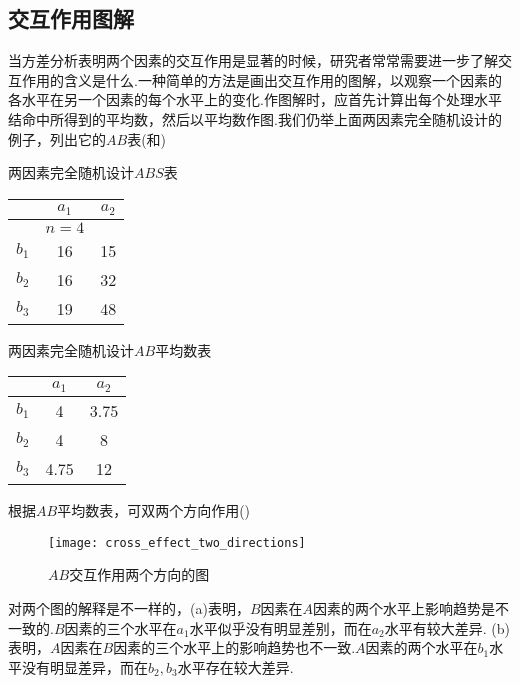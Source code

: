 \subsection{交互作用图解}
当方差分析表明两个因素的交互作用是显著的时候，研究者常常需要进一步了解交互作用的含义是什么.一种简单的方法是画出交互作用的图解，以观察一个因素的各水平在另一个因素的每个水平上的变化.作图解时，应首先计算出每个处理水平结命中所得到的平均数，然后以平均数作图.我们仍举上面两因素完全随机设计的例子，列出它的$AB$表(和)

\begin{margintable}
  \centering
  \caption{两因素完全随机设计$ABS$表}
    \begin{tabular}{ccc}
    \toprule
          & $a_1$ & $a_2$ \\
    \midrule
          & $n=4$ &  \\
    $b_1$ & 16    & 15 \\
    $b_2$ & 16    & 32 \\
    $b_3$ & 19    & 48 \\
    \bottomrule
    \end{tabular}%
\end{margintable}

\begin{margintable}
  \centering
  \caption{两因素完全随机设计$AB$平均数表}
    \begin{tabular}{ccc}
        \toprule
              & $a_1$ & $a_2$ \\
        \midrule
        $b_1$ & 4     & 3.75 \\
        $b_2$ & 4     & 8 \\
        $b_3$ & 4.75  & 12 \\
        \bottomrule
    \end{tabular}
\end{margintable}

根据$AB$平均数表，可双两个方向作用()

\begin{figure}
    \texttt{[image: cross\_effect\_two\_directions]}
    \caption{$AB$交互作用两个方向的图}
\end{figure}



对两个图的解释是不一样的，(a)表明，$B$因素在$A$因素的两个水平上影响趋势是不一致的.$B$因素的三个水平在$a_1$水平似乎没有明显差别，而在$a_2$水平有较大差异.
(b)表明，$A$因素在$B$因素的三个水平上的影响趋势也不一致.$A$因素的两个水平在$b_1$水平没有明显差异，而在$b_2,b_3$水平存在较大差异.

